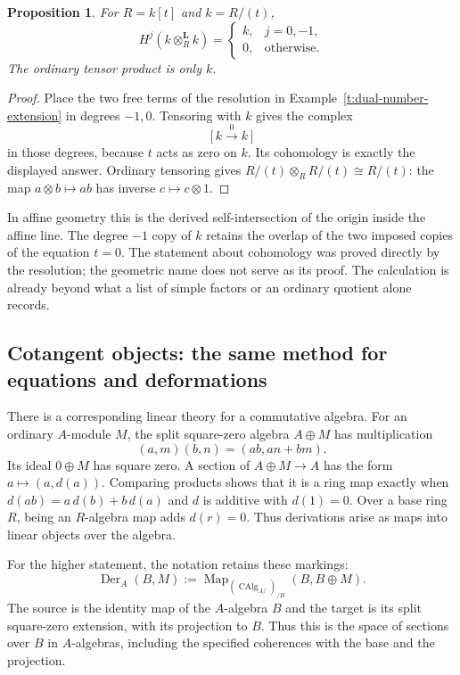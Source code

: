 \documentclass[11pt]{article}
\newtheorem{proposition}[theorem]{Proposition}
\theoremstyle{definition}
\theoremstyle{remark}\newtheorem{remark}[theorem]{Remark}
\begin{document}
\begin{proposition}\label{t:derived-intersection}
For $R=k[t]$ and $k=R/(t)$,
\[
 H^j(k\otimes_R^{\mathbf L}k)=
 \begin{cases}k,&j=0,-1,\\0,&\text{otherwise.}\end{cases}
\]
The ordinary tensor product is only $k$.
\end{proposition}
\begin{proof}
Place the two free terms of the resolution in
Example~\ref{t:dual-number-extension} in degrees $-1,0$.
Tensoring with $k$ gives the complex
\[
 \bigl[\,k\xrightarrow{\,0\,}k\,\bigr]
\]
in those degrees, because $t$ acts as zero on $k$.
Its cohomology is exactly the displayed answer.
Ordinary tensoring gives $R/(t)\otimes_R R/(t)\cong R/(t)$: the map
$a\otimes b\mapsto ab$ has inverse $c\mapsto c\otimes1$.
\end{proof}

In affine geometry this is the derived self-intersection of the origin
inside the affine line.  The degree $-1$ copy of $k$ retains the overlap
of the two imposed copies of the equation $t=0$.  The statement about
cohomology was proved directly by the resolution; the geometric name
does not serve as its proof.  The calculation is already beyond what a
list of simple factors or an ordinary quotient alone records.

\subsection{Cotangent objects: the same method for equations and deformations}

There is a corresponding linear theory for a commutative algebra.
For an ordinary $A$-module $M$, the split square-zero algebra $A\oplus M$
has multiplication
\[
 (a,m)(b,n)=(ab,an+bm).
\]
Its ideal $0\oplus M$ has square zero.  A section of
$A\oplus M\to A$ has the form $a\mapsto(a,d(a))$.  Comparing products
shows that it is a ring map exactly when
$d(ab)=a\,d(b)+b\,d(a)$ and $d$ is additive with $d(1)=0$.
Over a base ring $R$, being an $R$-algebra map adds $d(r)=0$.
Thus derivations arise as maps into linear objects over the algebra.

For the higher statement, the notation retains these markings:
\[
 \operatorname{Der}_A(B,M)
 :=\operatorname{Map}_{(\operatorname{CAlg}_{A/})_{/B}}
       (B,B\oplus M).
\]
The source is the identity map of the $A$-algebra $B$ and the target is
its split square-zero extension, with its projection to $B$.  Thus this
is the space of sections over $B$ in $A$-algebras, including the specified
coherences with the base and the projection.
\end{document}

